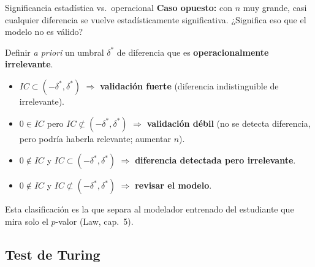 \documentclass[aspectratio=1610, 10pt]{beamer}
\begin{document}
\begin{frame}{Significancia estadística vs.\ operacional}
  \footnotesize
  \textbf{Caso opuesto:} con $n$ muy grande, casi cualquier diferencia se vuelve
  estadísticamente significativa. ¿Significa eso que el modelo no es válido?

  \vspace{4pt}
  \begin{metodobox}
    \footnotesize
    Definir \emph{a priori} un umbral $\delta^*$ de diferencia que es
    \textbf{operacionalmente irrelevante}.
    \begin{itemize}\itemsep1pt
      \item $IC \subset (-\delta^*,\delta^*)$ $\Rightarrow$
        \textbf{validación fuerte} (diferencia indistinguible de irrelevante).
      \item $0 \in IC$ pero $IC \not\subset (-\delta^*,\delta^*)$ $\Rightarrow$
        \textbf{validación débil} (no se detecta diferencia, pero podría haberla
        relevante; aumentar $n$).
      \item $0 \notin IC$ y $IC \subset (-\delta^*,\delta^*)$ $\Rightarrow$
        \textbf{diferencia detectada pero irrelevante}.
      \item $0 \notin IC$ y $IC \not\subset (-\delta^*,\delta^*)$ $\Rightarrow$
        \textbf{revisar el modelo}.
    \end{itemize}
  \end{metodobox}

  \vspace{4pt}
  \begin{alertabox}
    \footnotesize
    Esta clasificación es la que separa al modelador entrenado del estudiante
    que mira solo el $p$-valor (Law, cap.\ 5).
  \end{alertabox}
\end{frame}

\subsection{Test de Turing}
\end{document}
